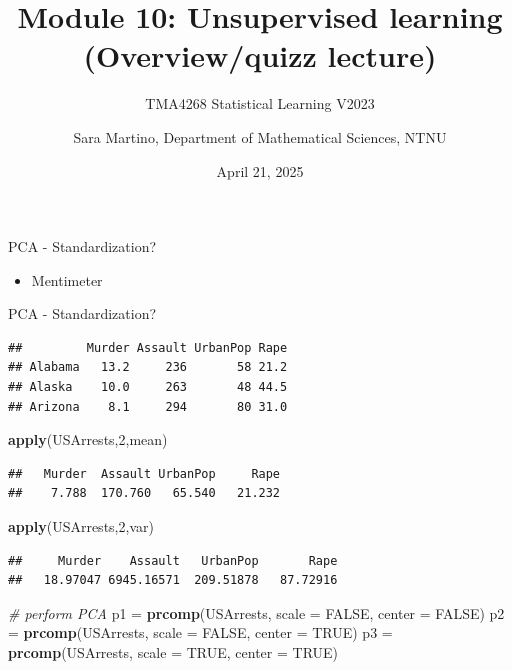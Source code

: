\documentclass[
  10pt,
  ignorenonframetext,
]{beamer}
\title{Module 10: Unsupervised learning (Overview/quizz lecture)}
\subtitle{TMA4268 Statistical Learning V2023}
\author{Sara Martino, Department of Mathematical Sciences, NTNU}
\date{April 21, 2025}
\newenvironment{Shaded}{\begin{snugshade}}{\end{snugshade}}
\newcommand{\AttributeTok}[1]{\textcolor[rgb]{0.13,0.29,0.53}{#1}}
\newcommand{\CommentTok}[1]{\textcolor[rgb]{0.56,0.35,0.01}{\textit{#1}}}
\newcommand{\ConstantTok}[1]{\textcolor[rgb]{0.56,0.35,0.01}{#1}}
\newcommand{\DecValTok}[1]{\textcolor[rgb]{0.00,0.00,0.81}{#1}}
\newcommand{\FunctionTok}[1]{\textcolor[rgb]{0.13,0.29,0.53}{\textbf{#1}}}
\newcommand{\NormalTok}[1]{#1}
\newcommand{\OtherTok}[1]{\textcolor[rgb]{0.56,0.35,0.01}{#1}}
\providecommand{\tightlist}{%
  \setlength{\itemsep}{0pt}\setlength{\parskip}{0pt}}
\begin{document}
\frame{\titlepage}

\begin{frame}{PCA - Standardization?}
\label{pca---standardization}
\begin{itemize}
\tightlist
\item
  Mentimeter
\end{itemize}
\end{frame}

\begin{frame}[fragile]{PCA - Standardization?}
\label{pca---standardization-1}
\begin{verbatim}
##         Murder Assault UrbanPop Rape
## Alabama   13.2     236       58 21.2
## Alaska    10.0     263       48 44.5
## Arizona    8.1     294       80 31.0
\end{verbatim}

\begin{Shaded}
\begin{Highlighting}[]
\FunctionTok{apply}\NormalTok{(USArrests,}\DecValTok{2}\NormalTok{,mean)}
\end{Highlighting}
\end{Shaded}

\begin{verbatim}
##   Murder  Assault UrbanPop     Rape 
##    7.788  170.760   65.540   21.232
\end{verbatim}

\begin{Shaded}
\begin{Highlighting}[]
\FunctionTok{apply}\NormalTok{(USArrests,}\DecValTok{2}\NormalTok{,var)}
\end{Highlighting}
\end{Shaded}

\begin{verbatim}
##     Murder    Assault   UrbanPop       Rape 
##   18.97047 6945.16571  209.51878   87.72916
\end{verbatim}

\begin{Shaded}
\begin{Highlighting}[]
\CommentTok{\# perform PCA}
\NormalTok{p1 }\OtherTok{=}  \FunctionTok{prcomp}\NormalTok{(USArrests, }\AttributeTok{scale =} \ConstantTok{FALSE}\NormalTok{, }\AttributeTok{center =} \ConstantTok{FALSE}\NormalTok{)}
\NormalTok{p2 }\OtherTok{=}  \FunctionTok{prcomp}\NormalTok{(USArrests, }\AttributeTok{scale =} \ConstantTok{FALSE}\NormalTok{, }\AttributeTok{center =} \ConstantTok{TRUE}\NormalTok{)}
\NormalTok{p3 }\OtherTok{=}  \FunctionTok{prcomp}\NormalTok{(USArrests, }\AttributeTok{scale =} \ConstantTok{TRUE}\NormalTok{, }\AttributeTok{center =} \ConstantTok{TRUE}\NormalTok{)}
\end{Highlighting}
\end{Shaded}
\end{frame}
\end{document}
